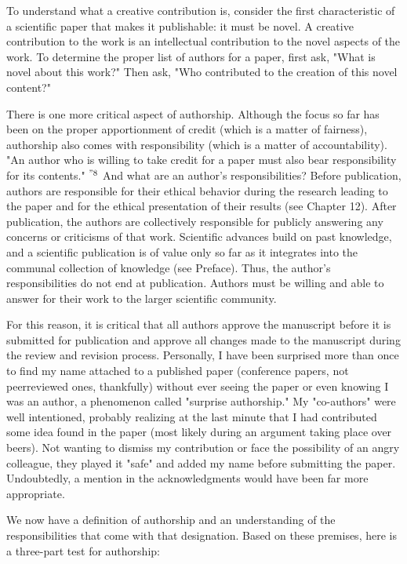 To understand what a creative contribution is, consider the first characteristic of a scientific paper that makes it publishable: it must be novel. A creative contribution to the work is an intellectual contribution to the novel aspects of the work. To determine the proper list of authors for a paper, first ask, "What is novel about this work?" Then ask, "Who contributed to the creation of this novel content?"

There is one more critical aspect of authorship. Although the focus so far has been on the proper apportionment of credit (which is a matter of fairness), authorship also comes with responsibility (which is a matter of accountability). "An author who is willing to take credit for a paper must also bear responsibility for its contents." ${ }^{" 8}$ And what are an author's responsibilities? Before publication, authors are responsible for their ethical behavior during the research leading to the paper and for the ethical presentation of their results (see Chapter 12). After publication, the authors are collectively responsible for publicly answering any concerns or criticisms of that work. Scientific advances build on past knowledge, and a scientific publication is of value only so far as it integrates into the communal collection of knowledge (see Preface). Thus, the author's responsibilities do not end at publication. Authors must be willing and able to answer for their work to the larger scientific community.

For this reason, it is critical that all authors approve the manuscript before it is submitted for publication and approve all changes made to the manuscript during the review and revision process. Personally, I have been surprised more than once to find my name attached to a published paper (conference papers, not peerreviewed ones, thankfully) without ever seeing the paper or even knowing I was an author, a phenomenon called "surprise authorship." $\mathrm{My}$ "co-authors" were well intentioned, probably realizing at the last minute that I had contributed some idea found in the paper (most likely during an argument taking place over beers). Not wanting to dismiss my contribution or face the possibility of an angry colleague, they played it "safe" and added my name before submitting the paper. Undoubtedly, a mention in the acknowledgments would have been far more appropriate.

We now have a definition of authorship and an understanding of the responsibilities that come with that designation. Based on these premises, here is a three-part test for authorship:

